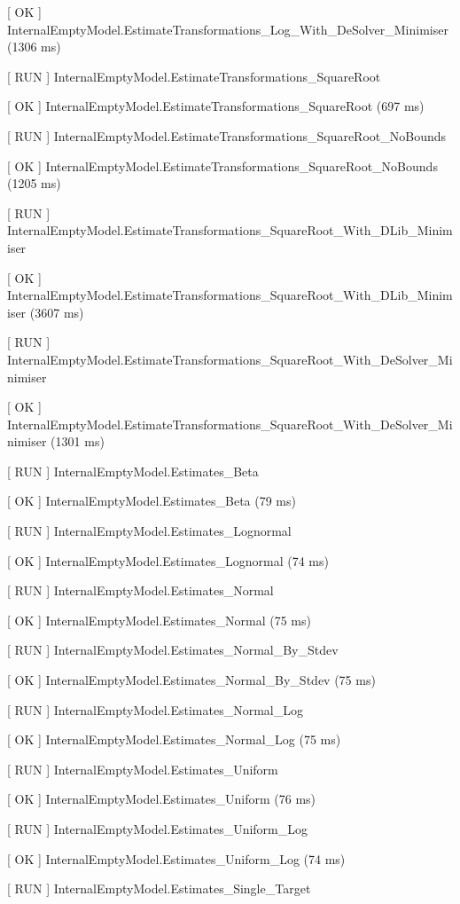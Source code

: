 \documentclass[a4paper,11pt,twoside,pdftex,draft]{article}
\begin{document}
{[} OK {]}
InternalEmptyModel.EstimateTransformations\_Log\_With\_DeSolver\_Minimiser
(1306 ms)

{[} RUN {]} InternalEmptyModel.EstimateTransformations\_SquareRoot

{[} OK {]} InternalEmptyModel.EstimateTransformations\_SquareRoot (697
ms)

{[} RUN {]}
InternalEmptyModel.EstimateTransformations\_SquareRoot\_NoBounds

{[} OK {]}
InternalEmptyModel.EstimateTransformations\_SquareRoot\_NoBounds (1205
ms)

{[} RUN {]}
InternalEmptyModel.EstimateTransformations\_SquareRoot\_With\_DLib\_Minimiser

{[} OK {]}
InternalEmptyModel.EstimateTransformations\_SquareRoot\_With\_DLib\_Minimiser
(3607 ms)

{[} RUN {]}
InternalEmptyModel.EstimateTransformations\_SquareRoot\_With\_DeSolver\_Minimiser

{[} OK {]}
InternalEmptyModel.EstimateTransformations\_SquareRoot\_With\_DeSolver\_Minimiser
(1301 ms)

{[} RUN {]} InternalEmptyModel.Estimates\_Beta

{[} OK {]} InternalEmptyModel.Estimates\_Beta (79 ms)

{[} RUN {]} InternalEmptyModel.Estimates\_Lognormal

{[} OK {]} InternalEmptyModel.Estimates\_Lognormal (74 ms)

{[} RUN {]} InternalEmptyModel.Estimates\_Normal

{[} OK {]} InternalEmptyModel.Estimates\_Normal (75 ms)

{[} RUN {]} InternalEmptyModel.Estimates\_Normal\_By\_Stdev

{[} OK {]} InternalEmptyModel.Estimates\_Normal\_By\_Stdev (75 ms)

{[} RUN {]} InternalEmptyModel.Estimates\_Normal\_Log

{[} OK {]} InternalEmptyModel.Estimates\_Normal\_Log (75 ms)

{[} RUN {]} InternalEmptyModel.Estimates\_Uniform

{[} OK {]} InternalEmptyModel.Estimates\_Uniform (76 ms)

{[} RUN {]} InternalEmptyModel.Estimates\_Uniform\_Log

{[} OK {]} InternalEmptyModel.Estimates\_Uniform\_Log (74 ms)

{[} RUN {]} InternalEmptyModel.Estimates\_Single\_Target
\end{document}
